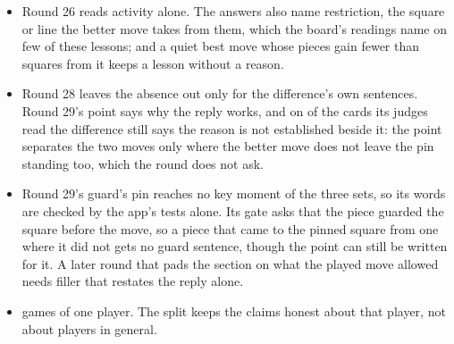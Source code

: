 \documentclass[11pt]{article}
\begin{document}
\begin{itemize}[nosep]
the pawn keep the board's narrower readings, and a square the better move covers only through a
line it opens is left out.
\item Round 26 reads activity alone. The answers also name restriction, the square or line the
better move takes from them, which the board's readings name on few of these lessons; and a quiet
best move whose pieces gain fewer than \RoundTwentySixIntoPlay{} squares from it keeps a lesson
without a reason.
\item Round 28 leaves the absence out only for the difference's own sentences. Round 29's point
says why the reply works, and on \RoundTwentyNineAbsentBeside{} of the cards its judges read the
difference still says the reason is not established beside it: the point separates the two moves
only where the better move does not leave the pin standing too, which the round does not ask.
\item Round 29's guard's pin reaches no key moment of the three sets, so its words are checked by
the app's tests alone. Its gate asks that the piece guarded the square before the move, so a piece
that came to the pinned square from one where it did not gets no guard sentence, though the point
can still be written for it. A later round
that pads the section on what the played move allowed needs filler that restates the reply
alone.
\item \Games{} games of one player. The split keeps the claims honest about that player, not
about players in general.
\end{itemize}
\end{document}
